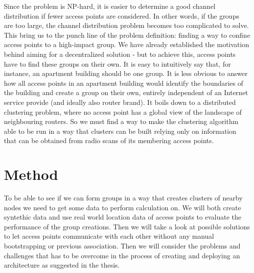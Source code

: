 Since the problem is NP-hard, it is easier to determine a good channel distribution if fewer access points are considered. In other words, if the groups are too large, 
the channel distribution problem becomes too complicated to solve. This bring us to the punch line of the problem definition: finding a way to confine access points to a high-impact group.
We have already established the motivation behind aiming for a decentralized solution - but to achieve this, access points have to find these groups on their own.
It is easy to intuitively say that, for instance, an apartment building should be one group. It is less obvious to answer how all access points in an apartment building
would identify the boundaries of the building and create a group on their own, entirely independent of an Internet service provide (and ideally also router brand).
It boils down to a distributed clustering problem, where no access point has a global view of the landscape of neighbouring routers. So we must find a way to make the clustering algorithm
able to be run in a way that clusters can be built relying only on information that can be obtained from radio scans of its membering access points.

\section{Method}
To be able to see if we can form groups in a way that creates clusters of nearby nodes we need to get some data to perform
calculation on. We will both create syntethic data and use real world location data of access points to evaluate the performance of the group creations. 
Then we will take a look at possible solutions to let access points communicate with each other without any manual bootstrapping or 
previous association. Then we will consider the problems and challenges that has to be overcome in the process of creating and deploying 
an architecture as suggested in the thesis. 





